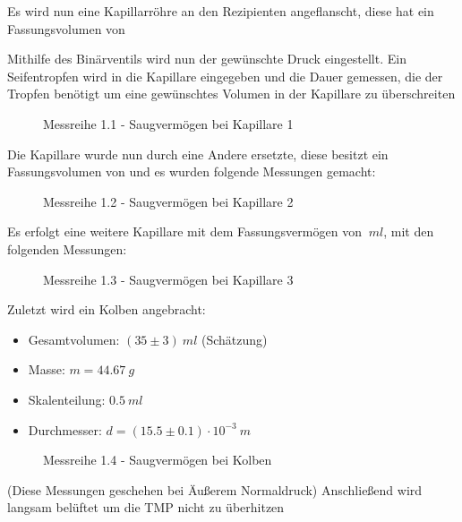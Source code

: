 \documentclass[12pt, a4paper]{scrartcl}
\begin{document}
    	Es wird nun eine Kapillarröhre an den Rezipienten angeflanscht, diese hat ein Fassungsvolumen von 
    
    	Mithilfe des Binärventils wird nun der gewünschte Druck eingestellt. Ein Seifentropfen wird in die Kapillare eingegeben und die Dauer gemessen, die der Tropfen benötigt um eine gewünschtes Volumen in der Kapillare zu überschreiten
    	
    	\begin{figure}[H]
    		\centering
    		
            \caption{Messreihe 1.1 - Saugvermögen bei Kapillare 1}
    	\end{figure}
    	
    	Die Kapillare wurde nun durch eine Andere ersetzte, diese besitzt ein Fassungsvolumen von 
        und es wurden folgende Messungen gemacht:
    	
 	    \begin{figure}[H]
    		\centering
    		
            \caption{Messreihe 1.2 - Saugvermögen bei Kapillare 2}
    	\end{figure}
    	
    	Es erfolgt eine weitere Kapillare mit dem Fassungsvermögen von $\ ml$, mit den folgenden Messungen:
    	
    	\begin{figure}[H]
			\centering
			
            \caption{Messreihe 1.3 - Saugvermögen bei Kapillare 3}
		\end{figure}
    	
    	Zuletzt wird ein Kolben angebracht:
    	
    	\begin{itemize}
    		\item Gesamtvolumen: $(35\pm3)\ ml$ (Schätzung)
    		\item Masse: $m=44.67\ g$
    		\item Skalenteilung: $0.5\ ml$
    		\item Durchmesser: $d=(15.5\pm0.1)\cdot10^{-3}\ m$
    	\end{itemize}
    
    	\begin{figure}[H]
			\centering
            
			\caption{Messreihe 1.4 - Saugvermögen bei Kolben}
		\end{figure}
    	
    	(Diese Messungen geschehen bei Äußerem Normaldruck)
    	Anschließend wird langsam belüftet um die TMP nicht zu überhitzen
    	
\end{document}
